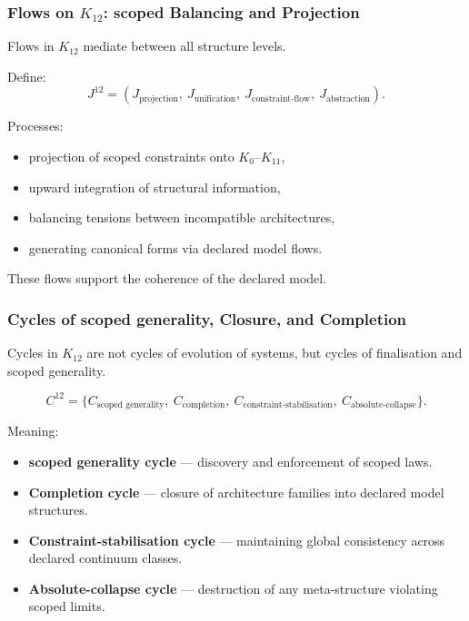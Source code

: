\subsubsection{Flows on $K_{12}$: scoped Balancing and Projection}

Flows in $K_{12}$ mediate between all structure levels.

Define:
\[
J^{12} = 
(J_{\text{projection}},\ J_{\text{unification}},\ 
 J_{\text{constraint-flow}},\ J_{\text{abstraction}}).
\]

Processes:
\begin{itemize}
    \item projection of scoped constraints onto $K_0$--$K_{11}$,
    \item upward integration of structural information,
    \item balancing tensions between incompatible architectures,
    \item generating canonical forms via declared model flows.
\end{itemize}

These flows support the coherence of the declared model.

\subsubsection{Cycles of scoped generality, Closure, and Completion}

Cycles in $K_{12}$ are not cycles of evolution of systems,
but cycles of finalisation and scoped generality.

\[
C^{12} = \{
C_{\text{scoped generality}},\
C_{\text{completion}},\
C_{\text{constraint-stabilisation}},\
C_{\text{absolute-collapse}}
\}.
\]

Meaning:
\begin{itemize}
    \item \textbf{scoped generality cycle}  
      --- discovery and enforcement of scoped laws.

    \item \textbf{Completion cycle}  
      --- closure of architecture families into declared model structures.

    \item \textbf{Constraint-stabilisation cycle}  
      --- maintaining global consistency across declared continuum classes.

    \item \textbf{Absolute-collapse cycle}  
      --- destruction of any meta-structure violating scoped limits.
\end{itemize}

